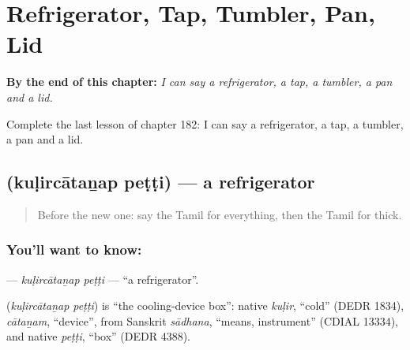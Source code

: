 
\chapter{Refrigerator, Tap, Tumbler, Pan, Lid}
\label{ch:ta-refrigerator-tap-tumbler-pan-lid}

\begin{chapteropening}
\textbf{By the end of this chapter:} \emph{I can say a refrigerator, a tap, a tumbler, a pan and a lid.}

Complete the last lesson of chapter 182: I can say a refrigerator, a tap, a tumbler, a pan and a lid.
\end{chapteropening}

\section[\texorpdfstring{\ta{குளிர்சாதனப்} \ta{பெட்டி} (kuḷircātaṉap peṭṭi)}{குளிர்சாதனப் பெட்டி (kuḷircātaṉap peṭṭi)}]{  (kuḷircātaṉap peṭṭi) — a refrigerator}

\label{lesson:TA-C182-kulircatanap-petti}



\begin{quote}
Before the new one: say the Tamil for everything, then the Tamil for thick.
\end{quote}

\subsection*{You'll want to know:  }
\textbf{ } — \emph{kuḷircātaṉap peṭṭi} — \textquotedblleft{}a refrigerator\textquotedblright{}.

\begin{cousinweb}
\textbf{ } (\emph{kuḷircātaṉap peṭṭi}) is \textquotedblleft{}the cooling-device box\textquotedblright{}: native \emph{kuḷir}, \textquotedblleft{}cold\textquotedblright{} (DEDR 1834), \emph{cātaṉam}, \textquotedblleft{}device\textquotedblright{}, from Sanskrit \emph{sādhana}, \textquotedblleft{}means, instrument\textquotedblright{} (CDIAL 13334), and native \emph{peṭṭi}, \textquotedblleft{}box\textquotedblright{} (DEDR 4388).
\end{cousinweb}

